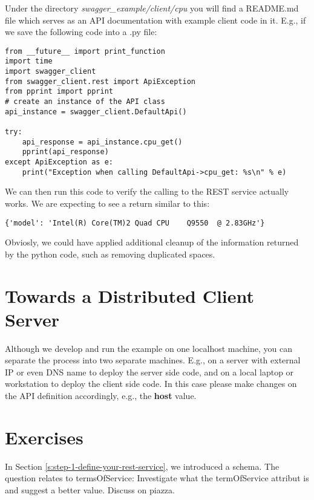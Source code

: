Under the directory \emph{swagger\_example/client/cpu} you will find a
README.md file which serves as an API documentation with example client
code in it. E.g., if we save the following code into a .py file:

\begin{lstlisting}
from __future__ import print_function
import time
import swagger_client
from swagger_client.rest import ApiException
from pprint import pprint
# create an instance of the API class
api_instance = swagger_client.DefaultApi()

try:
    api_response = api_instance.cpu_get()
    pprint(api_response)
except ApiException as e:
    print("Exception when calling DefaultApi->cpu_get: %s\n" % e)
\end{lstlisting}

We can then run this code to verify the calling to the REST service
actually works. We are expecting to see a return similar to this:

\begin{lstlisting}
{'model': 'Intel(R) Core(TM)2 Quad CPU    Q9550  @ 2.83GHz'}
\end{lstlisting}

Obviosly, we could have applied additional cleanup of the information
returned by the python code, such as removing duplicated spaces.

\section{Towards a Distributed Client
Server}\label{towards-a-distributed-client-server}

Although we develop and run the example on one localhost machine, you
can separate the process into two separate machines. E.g., on a server
with external IP or even DNS name to deploy the server side code, and on
a local laptop or workstation to deploy the client side code. In this
case please make changes on the API definition accordingly, e.g., the
\textbf{host} value.

\section{Exercises}\label{s:swagger-exercises}

\begin{exercise}
  In Section \ref{s:step-1-define-your-rest-service}, we introduced a
  schema. The question relates to termsOfService: Investigate what the
  termOfService attribut is and suggest a better value. Discuss on
  piazza.
\end{exercise}

